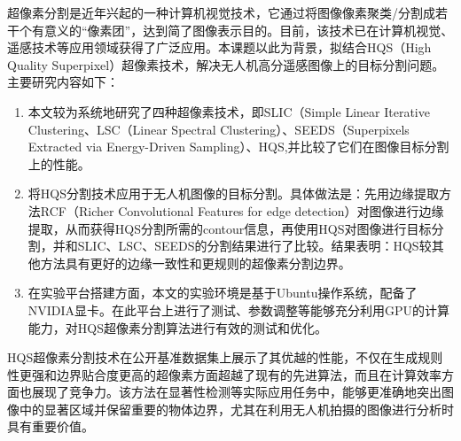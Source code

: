 超像素分割是近年兴起的一种计算机视觉技术，它通过将图像像素聚类/分割成若干个有意义的“像素团”，达到简了图像表示目的。目前，该技术已在计算机视觉、遥感技术等应用领域获得了广泛应用。本课题以此为背景，拟结合HQS（High Quality Superpixel）超像素技术，解决无人机高分遥感图像上的目标分割问题。主要研究内容如下：

\begin{enumerate}
\item 本文较为系统地研究了四种超像素技术，即SLIC（Simple Linear Iterative Clustering、LSC（Linear Spectral Clustering）、SEEDS（Superpixels Extracted via Energy-Driven Sampling）、HQS,并比较了它们在图像目标分割上的性能。

\item 将HQS分割技术应用于无人机图像的目标分割。具体做法是：先用边缘提取方法RCF（Richer Convolutional Features for edge detection）对图像进行边缘提取，从而获得HQS分割所需的contour信息，再使用HQS对图像进行目标分割，并和SLIC、LSC、SEEDS的分割结果进行了比较。结果表明：HQS较其他方法具有更好的边缘一致性和更规则的超像素分割边界。

\item 在实验平台搭建方面，本文的实验环境是基于Ubuntu操作系统，配备了NVIDIA显卡。在此平台上进行了测试、参数调整等能够充分利用GPU的计算能力，对HQS超像素分割算法进行有效的测试和优化。
\end{enumerate}

HQS超像素分割技术在公开基准数据集上展示了其优越的性能，不仅在生成规则性更强和边界贴合度更高的超像素方面超越了现有的先进算法，而且在计算效率方面也展现了竞争力。该方法在显著性检测等实际应用任务中，能够更准确地突出图像中的显著区域并保留重要的物体边界，尤其在利用无人机拍摄的图像进行分析时具有重要价值。
